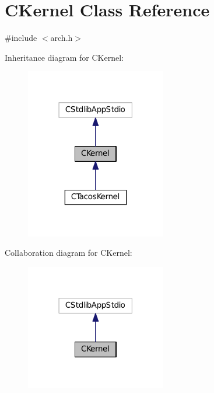 \hypertarget{classCKernel}{}\section{C\+Kernel Class Reference}
\label{classCKernel}


{\ttfamily \#include $<$arch.\+h$>$}



Inheritance diagram for C\+Kernel\+:
\nopagebreak
\begin{figure}[H]
\begin{center}
\leavevmode
\includegraphics[width=174pt]{classCKernel__inherit__graph}
\end{center}
\end{figure}


Collaboration diagram for C\+Kernel\+:
\nopagebreak
\begin{figure}[H]
\begin{center}
\leavevmode
\includegraphics[width=174pt]{classCKernel__coll__graph}
\end{center}
\end{figure}
